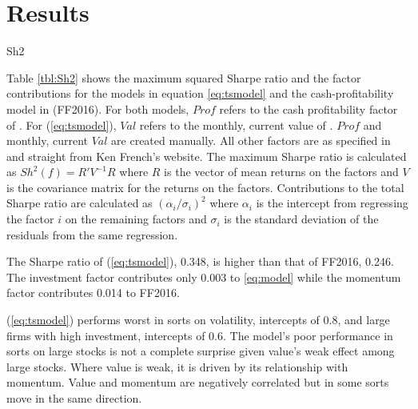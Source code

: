 
\section{Results} \label{sec:results}

{Sh2}

Table \ref{tbl:Sh2} shows the maximum squared Sharpe ratio and the factor contributions for 
the models in equation \ref{eq:tsmodel} and the cash-profitability model in 
\textcite{fama2016choosing} (FF2016).
For both models, $Prof$ refers to the cash profitability factor of \textcite{ball2016accruals}.
For (\ref{eq:tsmodel}), $Val$ refers to the monthly, current value of 
\textcite{asness2013devil}.
$Prof$ and monthly, current $Val$ are created manually.
All other factors are as specified in \textcite{fama2016dissecting} and straight from Ken 
French's 
website.
The maximum Sharpe ratio is calculated as $Sh^2(f)=R'V^{-1}R$ where $R$ is the vector of mean 
returns on the factors and $V$ is the covariance matrix for the returns on the factors.
Contributions to the total Sharpe ratio are calculated as $(\alpha_i / \sigma_i)^2$ where 
$\alpha_i$ is the intercept from regressing the factor $i$ on the remaining factors and 
$\sigma_i$ is the standard deviation of the residuals from the same regression.

The Sharpe ratio of (\ref{eq:tsmodel}), 0.348, is higher than that of FF2016, 0.246.
The investment factor contributes only 0.003 to \ref{eq:model} while the momentum factor 
contributes 0.014 to FF2016.

(\ref{eq:tsmodel}) performs worst in sorts on volatility, intercepts of 0.8, and large firms 
with high investment, intercepts of 0.6.
The model's poor performance in sorts on large stocks is not a complete surprise given value's 
weak effect among large stocks.
Where value is weak, it is driven by its relationship with momentum.
Value and momentum are negatively correlated but in some sorts move in the same direction.
